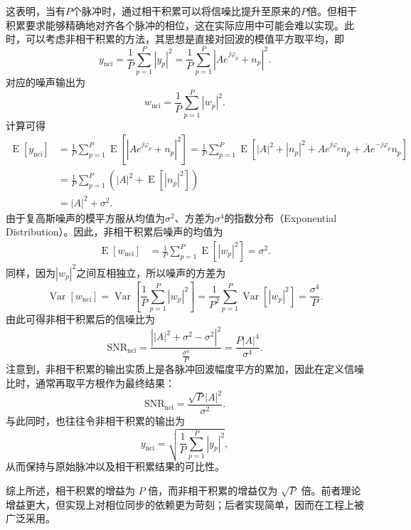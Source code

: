 这表明，当有\( P \)个脉冲时，通过相干积累可以将信噪比提升至原来的\( P \)倍。但相干积累要求能够精确地对齐各个脉冲的相位，这在实际应用中可能会难以实现。此时，可以考虑非相干积累的方法，其思想是直接对回波的模值平方取平均，即
\[
    y_{\mathrm{nci}} = \frac{1}{P} \sum_{p=1}^P |y_p|^2 = \frac{1}{P} \sum_{p=1}^P \left| A e^{j \varphi_p} + n_p \right|^2.
\]
对应的噪声输出为
\[
    w_{\mathrm{nci}} = \frac{1}{P} \sum_{p=1}^P |w_p|^2.
\]
计算可得
\[
    \begin{split}
        \operatorname{E}[y_{\mathrm{nci}}] & = \frac{1}{P} \sum_{p=1}^P \operatorname{E}\left[ |A e^{j \varphi_p} + n_p|^2 \right] = \frac{1}{P} \sum_{p=1}^P \operatorname{E} \left[ |A|^2 + |n_p|^2 + A e^{j \varphi_p} \overline{n}_p + \overline{A} e^{-j \varphi_p} n_p \right] \\
                                           & = \frac{1}{P} \sum_{p=1}^P \left( |A|^2 + \operatorname{E}[|n_p|^2] \right)                                                                                                                                                             \\
                                           & = |A|^2 + \sigma^2.
    \end{split}
\]
由于复高斯噪声的模平方服从均值为\( \sigma^2 \)、方差为\( \sigma^4 \)的指数分布（Exponential Distribution）。因此，非相干积累后噪声的均值为
\[
    \begin{split}
        \operatorname{E}[w_{\mathrm{nci}}] & =\frac{1}{P}  \sum_{p=1}^P \operatorname{E}\left[ |w_p|^2 \right] = \sigma^2.
    \end{split}
\]
同样，因为\( |w_p|^2 \)之间互相独立，所以噪声的方差为
\[
    \operatorname{Var}[w_{\mathrm{nci}}] = \operatorname{Var}\left[ \frac{1}{P} \sum_{p=1}^P |w_p|^2\right] = \frac{1}{P^2}\sum_{p=1}^P \operatorname{Var}\left[ |w_p|^2\right] = \frac{\sigma^4}{P}.
\]
由此可得非相干积累后的信噪比为
\[
    \mathrm{SNR}_{\mathrm{nci}} = \frac{\left||A|^2 + \sigma^2 - \sigma^2\right|^2}{\frac{\sigma^4}{P}} = \frac{P |A|^4}{\sigma^4}.
\]
注意到，非相干积累的输出实质上是各脉冲回波幅度平方的累加，因此在定义信噪比时，通常再取平方根作为最终结果：
\[
    \mathrm{SNR}_{\mathrm{nci}} = \frac{\sqrt{P} |A|^2}{\sigma^2}.
\]
与此同时，也往往令非相干积累的输出为
\[
    y_{\mathrm{nci}} = \sqrt{\frac{1}{P} \sum_{p=1}^P |y_p|^2},
\]
从而保持与原始脉冲以及相干积累结果的可比性。

综上所述，相干积累的增益为 \( P \) 倍，而非相干积累的增益仅为 \(\sqrt{P}\) 倍。前者理论增益更大，但实现上对相位同步的依赖更为苛刻；后者实现简单，因而在工程上被广泛采用。

